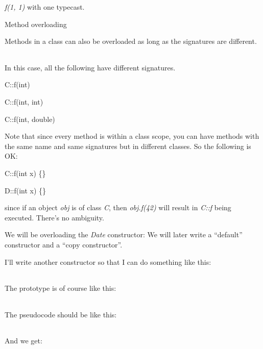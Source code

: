 \documentclass[
]{article}
\begin{document}
\emph{f(1, 1)} with one typecast.

Method overloading

Methods in a class can also be overloaded as long as the signatures are
different.

\begin{longtable}[]{@{}@{}}
\toprule
\endhead
\bottomrule
\end{longtable}

In this case, all the following have different signatures.

C::f(int)

C::f(int, int)

C::f(int, double)

Note that since every method is within a class scope, you can have
methods with the same name and same signatures but in different classes.
So the following is OK:

C::f(int x) \{\}

D::f(int x) \{\}

since if an object \emph{obj} is of class \emph{C}, then
\emph{obj.f(42)} will result in \emph{C::f} being executed. There's no
ambiguity.

We will be overloading the \emph{Date} constructor: We will later write
a ``default'' constructor and a ``copy constructor''.

I'll write another constructor so that I can do something like this:

\begin{longtable}[]{@{}@{}}
\toprule
\endhead
\bottomrule
\end{longtable}

The prototype is of course like this:

\begin{longtable}[]{@{}@{}}
\toprule
\endhead
\bottomrule
\end{longtable}

The pseudocode should be like this:

\begin{longtable}[]{@{}@{}}
\toprule
\endhead
\bottomrule
\end{longtable}

And we get:
\end{document}
